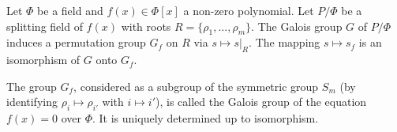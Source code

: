 Let $\Phi$ be a field and $f(x) \in \Phi[x]$ a non-zero polynomial. Let $P/\Phi$ be a splitting field of $f(x)$ with roots $R = \{\rho_1, \dots, \rho_m\}$. The Galois group $G$ of $P/\Phi$ induces a permutation group $G_f$ on $R$ via $s \mapsto s|_R$. The mapping $s \mapsto s_f$ is an isomorphism of $G$ onto $G_f$.

The group $G_f$, considered as a subgroup of the symmetric group $S_m$ (by identifying $\rho_i \mapsto \rho_{i'}$ with $i \mapsto i'$), is called the Galois group of the equation $f(x) = 0$ over $\Phi$. It is uniquely determined up to isomorphism.
